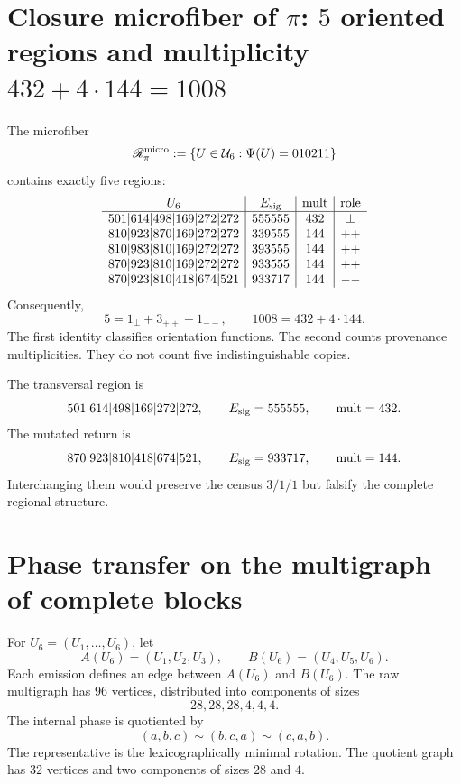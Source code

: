 \section{Closure microfiber of \(\pi\): \(5\) oriented regions and multiplicity \(432+4\cdot144=1008\)}

The microfiber
\[
 \mathscr R_\pi^{\rm micro}
 :=\{U\in\mathcal U_6:\Psi(U)=010211\}
\]
contains exactly five regions:
\[
\begin{array}{c|c|c|c}
U_6&E_{\rm sig}&\operatorname{mult}&\text{role}\\ \hline
501|614|498|169|272|272&555555&432&\perp\\
810|923|870|169|272|272&339555&144&++\\
810|983|810|169|272|272&393555&144&++\\
870|923|810|169|272|272&933555&144&++\\
870|923|810|418|674|521&933717&144&--
\end{array}
\]
Consequently,
\begin{equation}
 \boxed{
 5=1_\perp+3_{++}+1_{--},
 \qquad
 1008=432+4\cdot144.}
 \label{gfp:b:eq:descomposiciones-cinco-regiones-pi}
\end{equation}
The first identity classifies orientation functions. The second counts
provenance multiplicities. They do not count five indistinguishable copies.

The transversal region is
\[
 501|614|498|169|272|272,
 \qquad E_{\rm sig}=555555,
 \qquad\operatorname{mult}=432.
\]
The mutated return is
\[
 870|923|810|418|674|521,
 \qquad E_{\rm sig}=933717,
 \qquad\operatorname{mult}=144.
\]
Interchanging them would preserve the census \(3/1/1\) but falsify the complete
regional structure.

\section{Phase transfer on the multigraph of complete blocks}

For \(U_6=(U_1,\ldots,U_6)\), let
\[
 A(U_6)=(U_1,U_2,U_3),
 \qquad
 B(U_6)=(U_4,U_5,U_6).
\]
Each emission defines an edge between \(A(U_6)\) and \(B(U_6)\). The raw
multigraph has \(96\) vertices, distributed into components of sizes
\[
 28,28,28,4,4,4.
\]
The internal phase is quotiented by
\[
 (a,b,c)\sim(b,c,a)\sim(c,a,b).
\]
The representative is the lexicographically minimal rotation. The quotient
graph has \(32\) vertices and two components of sizes \(28\) and \(4\).

